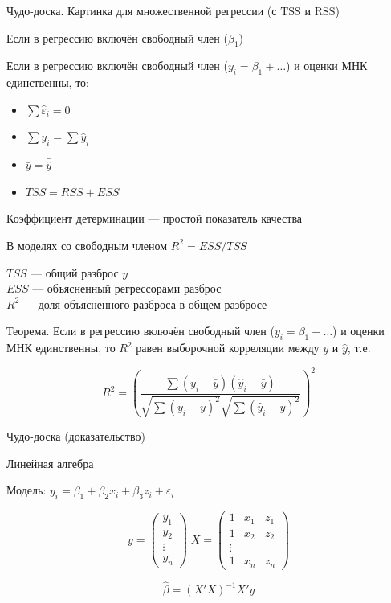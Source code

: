 \documentclass[ignorenonframetext,]{beamer}
\begin{document}
\begin{frame}{Чудо-доска. Картинка для множественной регрессии (с TSS и
RSS)}

\end{frame}

\begin{frame}{Если в регрессию включён свободный член ($\beta_1$)}

Если в регрессию включён свободный член ($y_i=\beta_1 + \ldots $) и
оценки МНК единственны, то:

\begin{itemize}
\itemsep1pt\parskip0pt
\item
  $\sum \hat{\varepsilon}_i=0$\\
\item
  $\sum y_i = \sum \hat{y}_i$\\
\item
  $\bar{y}=\bar{\hat{y}}$\\
\item
  $TSS=RSS+ESS$
\end{itemize}

\end{frame}

\begin{frame}{Коэффициент детерминации --- простой показатель качества}

В моделях со свободным членом $R^2=ESS/TSS$

$TSS$ --- общий разброс $y$\\$ESS$ --- объясненный регрессорами
разброс\\$R^2$ --- доля объясненного разброса в общем разбросе

Теорема. Если в регрессию включён свободный член
($y_i=\beta_1 + \ldots $) и оценки МНК единственны, то $R^2$ равен
выборочной корреляции между $y$ и $\hat{y}$, т.е.

\[
R^2=\left(\frac{\sum (y_i-\bar{y})(\hat{y}_i-\bar{y})}{\sqrt{\sum(y_i-\bar{y})^2}\sqrt{\sum(\hat{y}_i-\bar{y})^2}}\right)^2
\]

\end{frame}

\begin{frame}{Чудо-доска (доказательство)}

\end{frame}

\begin{frame}{Линейная алгебра}

Модель: $y_i=\beta_1 + \beta_2 x_i +\beta_3 z_i +\varepsilon_i$

\[
y=\begin{pmatrix}
y_1 \\
y_2 \\
\vdots \\
y_n 
\end{pmatrix}
\; X=\begin{pmatrix}
1 & x_1 & z_1 \\
1 & x_2 & z_2 \\
\vdots \\
1 & x_n & z_n 
\end{pmatrix}
\]

\[
\hat{\beta}=(X'X)^{-1}X'y
\]

\end{frame}
\end{document}
